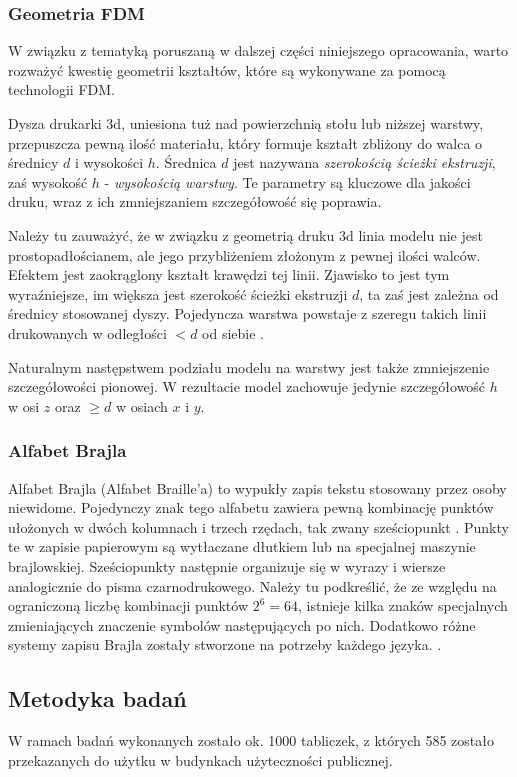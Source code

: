 \documentclass[12pt,a4paper]{article}
\begin{document}
\subsubsection{Geometria FDM}
W związku z tematyką poruszaną w dalszej części niniejszego opracowania, warto rozważyć kwestię geometrii kształtów, które są wykonywane za pomocą technologii FDM.

Dysza drukarki 3d, uniesiona tuż nad powierzchnią stołu lub niższej warstwy, przepuszcza pewną ilość materiału, który formuje kształt zbliżony do walca o średnicy $d$ i wysokości $h$.
Średnica $d$ jest nazywana \emph{szerokością ścieżki ekstruzji}, zaś wysokość $h$ - \emph{wysokością warstwy}. Te parametry są kluczowe dla jakości druku, wraz z ich zmniejszaniem szczegółowość się poprawia.

Należy tu zauważyć, że w związku z geometrią druku 3d linia modelu nie jest prostopadłościanem, ale jego przybliżeniem złożonym z pewnej ilości walców. Efektem jest zaokrąglony kształt krawędzi tej linii. Zjawisko to jest tym wyraźniejsze, im większa jest szerokość ścieżki ekstruzji $d$, ta zaś jest zależna od średnicy stosowanej dyszy.
Pojedyncza warstwa powstaje z szeregu takich linii drukowanych w odległości $<d$ od siebie \cite{slicmath}.

Naturalnym następstwem podziału modelu na warstwy jest także zmniejszenie szczegółowości pionowej.
W rezultacie model zachowuje jedynie szczegółowość $h$ w osi $z$ oraz $\geq d$ w osiach $x$ i $y$.

\subsubsection{Alfabet Brajla}
Alfabet Brajla (Alfabet Braille'a) to wypukły zapis tekstu stosowany przez osoby niewidome. Pojedynczy znak tego alfabetu zawiera pewną kombinację punktów ułożonych w dwóch kolumnach i trzech rzędach, tak zwany sześciopunkt \cite{braille}. Punkty te w zapisie papierowym są wytłaczane dłutkiem lub na specjalnej maszynie brajlowskiej.
Sześciopunkty następnie organizuje się w wyrazy i wiersze analogicznie do pisma czarnodrukowego.
Należy tu podkreślić, że ze względu na ograniczoną liczbę kombinacji punktów $2^6=64$, istnieje kilka znaków specjalnych zmieniających znaczenie symbolów następujących po nich. Dodatkowo różne systemy zapisu Brajla zostały stworzone na potrzeby każdego języka. \cite{braillepolish} \cite{brailleenglish} .


\subsection{Metodyka badań}
W ramach badań wykonanych zostało ok. 1000 tabliczek, z których 585 zostało przekazanych do użytku w budynkach użyteczności publicznej.
\end{document}
